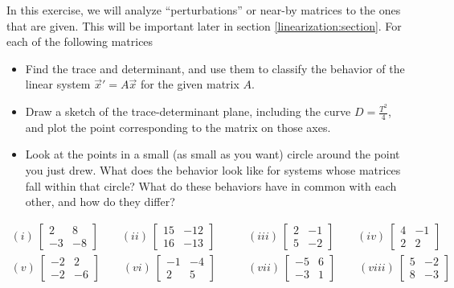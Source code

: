 \documentclass{ximera}
\begin{document}
\begin{exercise}
    In this exercise, we will analyze ``perturbations'' or near-by matrices to the ones that are given. This will be important later in section \ref{linearization:section}. For each of the following matrices
    \begin{itemize}
        \item Find the trace and determinant, and use them to classify the behavior of the linear system ${\vec{x}}' = A\vec{x}$ for the given matrix $A$.
        \item Draw a sketch of the trace-determinant plane, including the curve $D = \frac{T^2}{4}$, and plot the point corresponding to the matrix on those axes.
        \item Look at the points in a small (as small as you want) circle around the point you just drew. What does the behavior look like for systems whose matrices fall within that circle? What do these behaviors have in common with each other, and how do they differ?
    \end{itemize}
    \begin{equation*}
    \begin{split}
        (i)\ \begin{bmatrix} 2 & 8 \\ -3 & -8 \end{bmatrix} \qquad (ii)\ \begin{bmatrix} 15 & -12 \\ 16 & -13 \end{bmatrix} \qquad &(iii)\ \begin{bmatrix} 2 & -1 \\ 5 & -2 \end{bmatrix} \qquad (iv)\ \begin{bmatrix} 4 & -1 \\ 2 & 2 \end{bmatrix}\\
        (v)\ \begin{bmatrix} -2 & 2 \\ -2 & -6 \end{bmatrix} \qquad (vi)\ \begin{bmatrix} -1 & -4 \\ 2 & 5 \end{bmatrix} \qquad &(vii)\ \begin{bmatrix} -5 & 6 \\ -3 & 1 \end{bmatrix} \qquad (viii)\ \begin{bmatrix} 5 & -2 \\ 8 & -3 \end{bmatrix} 

\end{split}
\end{equation*}
\end{exercise}
\end{document}
